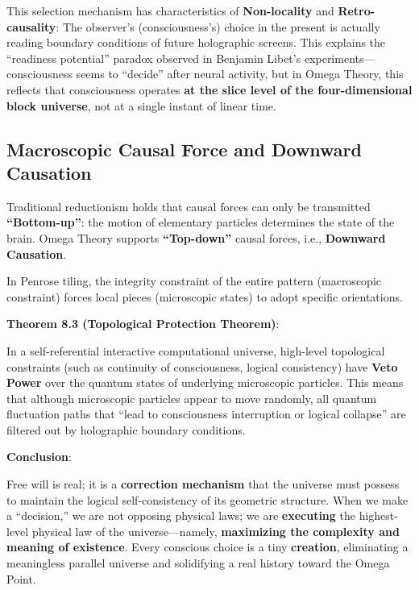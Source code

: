 This selection mechanism has characteristics of \textbf{Non-locality} and \textbf{Retro-causality}:
The observer's (consciousness's) choice in the present is actually reading boundary conditions of future holographic screens. This explains the ``readiness potential'' paradox observed in Benjamin Libet's experiments---consciousness seems to ``decide'' after neural activity, but in Omega Theory, this reflects that consciousness operates \textbf{at the slice level of the four-dimensional block universe}, not at a single instant of linear time.

\subsection{Macroscopic Causal Force and Downward Causation}

Traditional reductionism holds that causal forces can only be transmitted \textbf{``Bottom-up''}: the motion of elementary particles determines the state of the brain.
Omega Theory supports \textbf{``Top-down''} causal forces, i.e., \textbf{Downward Causation}.

In Penrose tiling, the integrity constraint of the entire pattern (macroscopic constraint) forces local pieces (microscopic states) to adopt specific orientations.

\textbf{Theorem 8.3 (Topological Protection Theorem)}:

In a self-referential interactive computational universe, high-level topological constraints (such as continuity of consciousness, logical consistency) have \textbf{Veto Power} over the quantum states of underlying microscopic particles.
This means that although microscopic particles appear to move randomly, all quantum fluctuation paths that ``lead to consciousness interruption or logical collapse'' are filtered out by holographic boundary conditions.

\textbf{Conclusion}:

Free will is real; it is a \textbf{correction mechanism} that the universe must possess to maintain the logical self-consistency of its geometric structure.
When we make a ``decision,'' we are not opposing physical laws; we are \textbf{executing} the highest-level physical law of the universe---namely, \textbf{maximizing the complexity and meaning of existence}. Every conscious choice is a tiny \textbf{creation}, eliminating a meaningless parallel universe and solidifying a real history toward the Omega Point.
